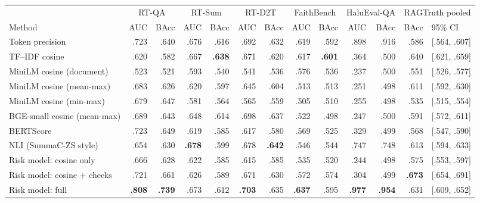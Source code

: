 \begin{tabular}{lrrrrrrrrrrrl}
\toprule
 & \multicolumn{2}{c}{RT-QA} & \multicolumn{2}{c}{RT-Sum} & \multicolumn{2}{c}{RT-D2T} & \multicolumn{2}{c}{FaithBench} & \multicolumn{2}{c}{HaluEval-QA} & \multicolumn{2}{c}{RAGTruth pooled} \\
Method & AUC & BAcc & AUC & BAcc & AUC & BAcc & AUC & BAcc & AUC & BAcc & BAcc & 95\% CI \\
\midrule
Token precision & .723 & .640 & .676 & .616 & .692 & .632 & .619 & .592 & .898 & .916 & .586 & [.564, .607] \\
TF--IDF cosine & .620 & .582 & .667 & \textbf{.638} & .671 & .620 & .617 & \textbf{.601} & .364 & .500 & .640 & [.621, .659] \\
\midrule
MiniLM cosine (document) & .523 & .521 & .593 & .540 & .541 & .536 & .576 & .536 & .237 & .500 & .551 & [.526, .577] \\
MiniLM cosine (mean-max) & .683 & .626 & .620 & .597 & .645 & .604 & .513 & .513 & .251 & .498 & .611 & [.592, .630] \\
MiniLM cosine (min-max) & .679 & .647 & .581 & .564 & .565 & .559 & .505 & .510 & .255 & .498 & .535 & [.515, .554] \\
BGE-small cosine (mean-max) & .689 & .643 & .648 & .614 & .698 & .637 & .522 & .498 & .247 & .500 & .591 & [.572, .611] \\
\midrule
BERTScore & .723 & .649 & .619 & .585 & .617 & .580 & .569 & .525 & .329 & .499 & .568 & [.547, .590] \\
NLI (SummaC-ZS style) & .654 & .630 & \textbf{.678} & .599 & .678 & \textbf{.642} & .546 & .544 & .747 & .748 & .613 & [.594, .633] \\
\midrule
Risk model: cosine only & .666 & .628 & .622 & .585 & .615 & .585 & .535 & .520 & .244 & .498 & .575 & [.553, .597] \\
Risk model: cosine + checks & .721 & .661 & .626 & .589 & .671 & .630 & .572 & .574 & .304 & .499 & \textbf{.673} & [.654, .691] \\
Risk model: full & \textbf{.808} & \textbf{.739} & .673 & .612 & \textbf{.703} & .635 & \textbf{.637} & .595 & \textbf{.977} & \textbf{.954} & .631 & [.609, .652] \\
\bottomrule
\end{tabular}

